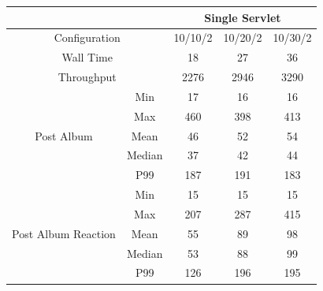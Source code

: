 \documentclass[a4paper,12pt]{article} %
\begin{document}
\begin{enumerate}
\begin{table}[H]
    \begin{tabular}{|cc|ccc|}
    \hline
    \multicolumn{2}{|c|}{}                                              & \multicolumn{3}{c|}{Single Servlet}                                   \\ \hline
    \multicolumn{2}{|c|}{Configuration}                                 & \multicolumn{1}{c|}{10/10/2} & \multicolumn{1}{c|}{10/20/2} & 10/30/2 \\ \hline
    \multicolumn{2}{|c|}{Wall Time}                                     & \multicolumn{1}{c|}{18}      & \multicolumn{1}{c|}{27}      & 36      \\ \hline
    \multicolumn{2}{|c|}{Throughput}                                    & \multicolumn{1}{c|}{2276}    & \multicolumn{1}{c|}{2946}    & 3290    \\ \hline
    \multicolumn{1}{|c|}{\multirow{5}{*}{Post Album}}          & Min    & \multicolumn{1}{c|}{17}      & \multicolumn{1}{c|}{16}      & 16      \\ \cline{2-5} 
    \multicolumn{1}{|c|}{}                                     & Max    & \multicolumn{1}{c|}{460}     & \multicolumn{1}{c|}{398}     & 413     \\ \cline{2-5} 
    \multicolumn{1}{|c|}{}                                     & Mean   & \multicolumn{1}{c|}{46}      & \multicolumn{1}{c|}{52}      & 54      \\ \cline{2-5} 
    \multicolumn{1}{|c|}{}                                     & Median & \multicolumn{1}{c|}{37}      & \multicolumn{1}{c|}{42}      & 44      \\ \cline{2-5} 
    \multicolumn{1}{|c|}{}                                     & P99    & \multicolumn{1}{c|}{187}     & \multicolumn{1}{c|}{191}     & 183     \\ \hline
    \multicolumn{1}{|c|}{\multirow{5}{*}{Post Album Reaction}} & Min    & \multicolumn{1}{c|}{15}      & \multicolumn{1}{c|}{15}      & 15      \\ \cline{2-5} 
    \multicolumn{1}{|c|}{}                                     & Max    & \multicolumn{1}{c|}{207}     & \multicolumn{1}{c|}{287}     & 415     \\ \cline{2-5} 
    \multicolumn{1}{|c|}{}                                     & Mean   & \multicolumn{1}{c|}{55}      & \multicolumn{1}{c|}{89}      & 98      \\ \cline{2-5} 
    \multicolumn{1}{|c|}{}                                     & Median & \multicolumn{1}{c|}{53}      & \multicolumn{1}{c|}{88}      & 99      \\ \cline{2-5} 
    \multicolumn{1}{|c|}{}                                     & P99    & \multicolumn{1}{c|}{126}     & \multicolumn{1}{c|}{196}     & 195     \\ \hline
    \end{tabular}
\end{table}


\end{enumerate}
\end{document}
